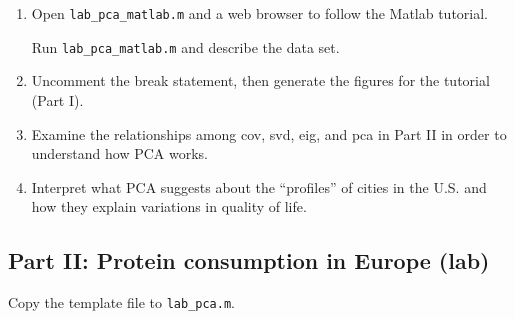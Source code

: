 \documentclass[11pt,titlepage,fleqn]{article}
\begin{document}
\begin{enumerate}
\item Open \verb+lab_pca_matlab.m+ and a web browser to follow the Matlab tutorial.

Run \verb+lab_pca_matlab.m+ and describe the data set.

\item Uncomment the break statement, then generate the figures for the tutorial (Part I).

\item Examine the relationships among cov, svd, eig, and pca in Part II in order to understand how PCA works.

\item Interpret what PCA suggests about the ``profiles'' of cities in the U.S. and how they explain variations in quality of life.



\end{enumerate}


\subsection*{Part II: Protein consumption in Europe (lab)}

Copy the template file to \verb+lab_pca.m+.
\end{document}
